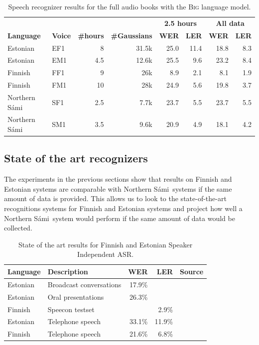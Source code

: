 \documentclass[b5paper]{article}
\newcommand{\ns}{Northern Sámi}
\newcommand{\ds}[1]{\textsc{#1}}
\begin{document}
\begin{table}
\centering
\begin{tabular}{llrr|rr|rr}
& & & & \multicolumn{2}{|c}{\textbf{2.5 hours}} & \multicolumn{2}{|c}{\textbf{All data}} \\
\textbf{Language} & \textbf{Voice} & \textbf{\#hours}  &\textbf{\#Gaussians} & \textbf{WER} & \textbf{LER}& \textbf{{WER}} & \textbf{LER} \\\hline %
Estonian & EF1 & 8 &31.5k & 25.0  & 11.4 & 18.8 & 8.3  \\
Estonian & EM1& 4.5& 12.6k&25.5 & 9.6  & 23.2 & 8.4  \\
Finnish & FF1 & 9 & 26k & 8.9 & 2.1  & 8.1 &  1.9  \\
Finnish & FM1 & 10 & 28k & 24.9 & 5.6  & 19.8  & 3.7    \\
\ns & SF1 & 2.5   & 7.7k & 23.7  & 5.5  & 23.7  & 5.5  \\
\ns &SM1 & 3.5 &9.6k & 20.9 & 4.9  & 18.1  & 4.2   \\
\end{tabular}
\caption{Speech recognizer results for the full audio books with the \ds{Big} language model.\label{tbl:resultbigcomp}}
\end{table}


\subsection{State of the art recognizers}
The experiments in the previous sections show that results on Finnish and Estonian systems are comparable with \ns\ systems if the same amount of data is provided. This allows us to look to the state-of-the-art recognitions systems for Finnish and Estonian systems and project how well a \ns\ system would perform if the same amount of data would be collected.

\begin{table}
\centering
\begin{tabular}{llrrl}
\textbf{Language} & \textbf{Description} & \textbf{WER} & \textbf{LER} & \textbf{Source}\\\hline
Estonian & Broadcast conversations  & 17.9\% & &  \cite{alumae2014recent} \\
Estonian & Oral presentations  & 26.3\% & & \cite{alumae2014recent} \\
Finnish & Speecon testset  & & 2.9\%&  \cite{pylkkonen2012} \\
Estonian & Telephone speech &33.1\% & 11.9\% & \cite{hirsimaki2009importance}\\
Finnish & Telephone speech & 21.6\% & 6.8\% & \cite{hirsimaki2009importance}\\
\end{tabular}
\caption{State of the art results for Finnish and Estonian Speaker Independent ASR.}\label{tbl:stateoftheart}
\end{table}
\end{document}
